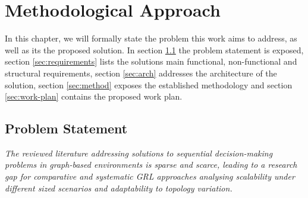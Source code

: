 \chapter{Methodological Approach} \label{chap:method-approach}

In this chapter, we will formally state the problem this work aims to address, as well as its the proposed solution. In section \ref{sec:problem} the problem statement is exposed, section \ref{sec:requirements} lists the solutions main functional, non-functional and structural requirements, section \ref{sec:arch} addresses the architecture of the solution, section \ref{sec:method} exposes the established methodology and section \ref{sec:work-plan} contains the proposed work plan.

\section{Problem Statement} \label{sec:problem}

\begin{displayquote}
	 \textit{The reviewed literature addressing solutions to sequential decision-making problems in graph-based environments is sparse and scarce, leading to a research gap for comparative and systematic \ac{GRL} approaches analysing scalability under different sized scenarios and adaptability to topology variation.}
\end{displayquote}

